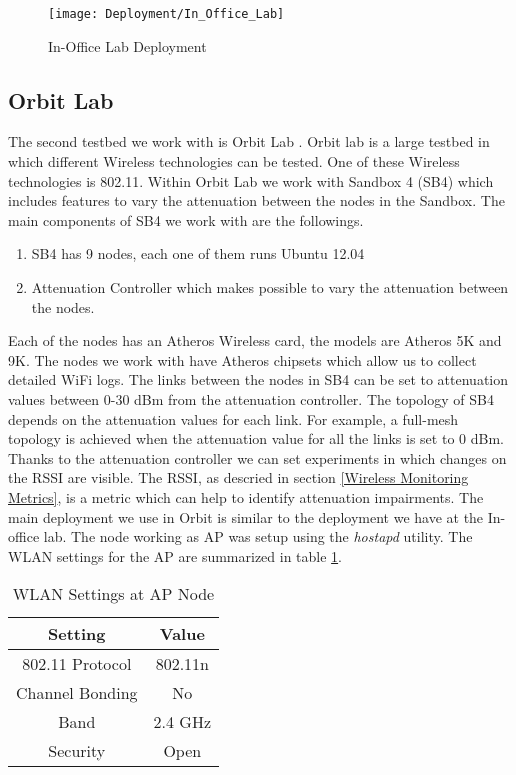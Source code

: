 	
\begin{figure}[h]
	\centering
	\texttt{[image: Deployment/In\_Office\_Lab]}
	\caption{In-Office Lab Deployment}
	\label{image:In_Office_Lab_Deployment}
\end{figure}
		

\subsection*{Orbit Lab}

The second testbed we work with is Orbit Lab \cite{orbit2005}. Orbit lab is a large testbed in which different Wireless technologies can be tested. One of these Wireless technologies is 802.11. Within Orbit Lab we work with Sandbox 4 (SB4) which includes features to vary the attenuation between the nodes in the Sandbox. The main components of SB4 we work with are the followings.

\begin{enumerate}
	\item SB4 has 9 nodes, each one of them runs Ubuntu 12.04
	\item Attenuation Controller which makes possible to vary the attenuation between the nodes.
\end{enumerate}

Each of the nodes has an Atheros Wireless card, the models are Atheros 5K and 9K. The nodes we work with have Atheros chipsets which allow us to collect detailed WiFi logs. The links between the nodes in SB4 can be set to attenuation values between 0-30 dBm from the attenuation controller. The topology of SB4 depends on the attenuation values for each link. For example, a full-mesh topology is achieved when the attenuation value for all the links is set to 0 dBm. Thanks to the attenuation controller we can set experiments in which changes on the RSSI are visible. The RSSI, as descried in section \ref{Wireless Monitoring Metrics}, is a metric which can help to identify attenuation impairments. The main deployment we use in  Orbit is similar to the deployment we have at the In-office lab. The node working as AP was setup using the \emph{hostapd} utility. The WLAN settings for the AP are summarized in table \ref{table:WLAN_Settings_AP_Node}.

\begin{table}[h]
	\begin{center}
		\begin{tabular}{||c c||}
			\hline
			Setting & Value\\ [0.5ex] 
			\hline\hline
			802.11 Protocol & 802.11n\\ 
			\hline
			Channel Bonding & No\\
			\hline
			Band & 2.4 GHz\\
			\hline
			Security & Open\\ [1ex] 
			\hline
		\end{tabular}
	\end{center}
	\caption{WLAN Settings at AP Node}
	\label{table:WLAN_Settings_AP_Node}
\end{table} 


